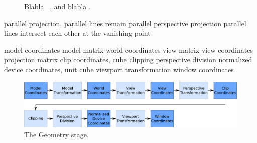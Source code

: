 \begin{figure}
\centering
{}
\caption[View frustum, canonical cube]{Blabla
~,
and blabla .}
\label{fig:Schmorrn}
\end{figure}



parallel projection, parallel lines remain parallel
perspective projection parallel lines intersect each other at the vanishing
point

model coordinates
model matrix
world coordinates
view matrix
view coordinates
projection matrix
clip coordinates, cube
clipping
perspective division
normalized device coordinates, unit cube
viewport transformation
window coordinates
\begin{figure}
\begin{center}
\includegraphics[scale=0.5]{Images/Geometry-Stage.pdf}
\caption{The Geometry stage.}
\label{fig:GeometryStage}
\end{center}
\end{figure}


